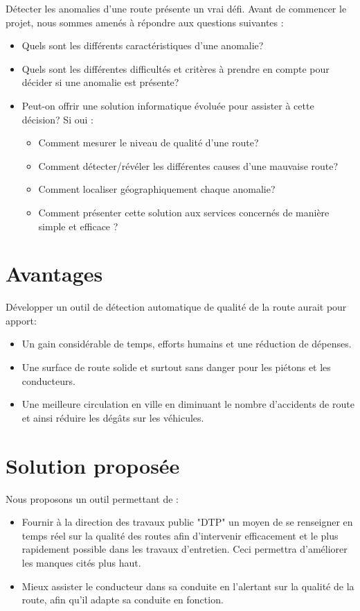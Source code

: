Détecter les anomalies d'une route présente un vrai défi. Avant de commencer le projet,
nous sommes amenés à répondre aux questions suivantes :
\renewcommand{\labelitemi}{$\bullet$}
\begin{itemize}
  \item Quels sont les différents caractéristiques d'une anomalie?
  \item Quels sont les différentes difficultés et critères à prendre en compte pour décider si une anomalie est présente?
  \item Peut-on offrir une solution informatique évoluée pour assister à cette décision? Si oui :
        \begin{itemize}
          \item Comment mesurer le niveau de qualité d'une route?
          \item Comment détecter/révéler les différentes causes d'une mauvaise route?
          \item Comment localiser géographiquement chaque anomalie?
          \item Comment présenter cette solution aux services concernés de manière simple et efficace ?
        \end{itemize}
\end{itemize}

\section{Avantages}
Développer un outil de détection automatique de qualité de la route aurait pour apport:
\renewcommand{\labelitemi}{$\bullet$}
\begin{itemize}
  \item Un gain considérable de temps, efforts humains et une réduction de dépenses.
  \item Une surface de route solide et surtout sans danger pour les piétons et les conducteurs.
  \item Une meilleure circulation en ville en diminuant le nombre d'accidents de route et ainsi réduire les dégâts sur les véhicules.
\end{itemize}


\section{Solution proposée}
Nous proposons un outil permettant de :
\renewcommand{\labelitemi}{$\bullet$}
\begin{itemize}
  \item Fournir à la direction des travaux public "DTP" un moyen de se renseigner en temps réel sur la qualité des routes afin d'intervenir efficacement et le plus rapidement possible dans les travaux d'entretien. Ceci permettra d'améliorer les manques cités plus haut.
  \item Mieux assister le conducteur dans sa conduite en l'alertant  sur la qualité de la route, afin qu'il adapte sa conduite en fonction.
\end{itemize}

